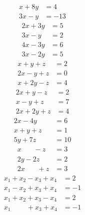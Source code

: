 \begin{align*}
x+8y&=4\\
3x-y&=-13
\end{align*}
\begin{align*}
2x+3y&=5\\
3x-y&=2
\end{align*}
\begin{align*}
4x-3y&=6\\
3x-2y&=5
\end{align*}
\begin{align*}
x+y+z&=2\\
2x-y+z&=0\\
x+2y-z&=4
\end{align*}
\begin{align*}
2x+y-z&=2\\
x-y+z&=7\\
2x+2y+z&=4
\end{align*}
\begin{align*}
2x-4y\phantom{+3z}&=6\\
x+y+z&=1\\
5y+7z&=10
\end{align*}
\begin{align*}
x\phantom{+2y}-z&=3\\
2y-2z&=2\\
2x\phantom{+2y}+z&=3
\end{align*}
\begin{align*}
x_1+x_2-x_3+x_4&=2\\
x_1-x_2+x_3+x_4&=-1\\
x_1+x_2+x_3-x_4&=2\\
x_1\phantom{+2x_2}+x_3+x_4&=-1
\end{align*}

